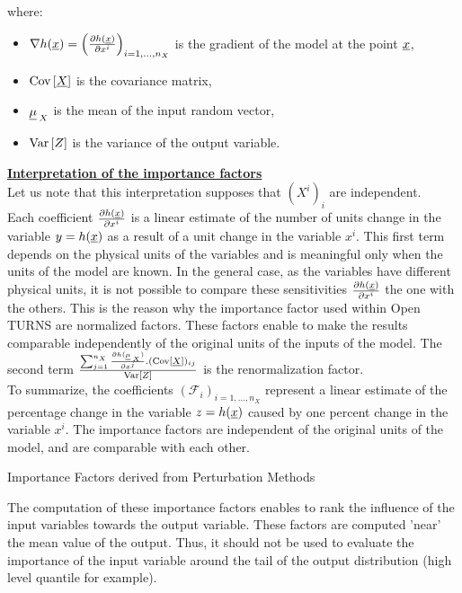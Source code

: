 {  where:
  \begin{itemize}
  \item $\nabla h(\underline{x}) = \left( \frac{\partial h(\underline{x})}{\partial x^i}\right)_{i=1,\ldots,n_X}$ is the gradient of the model at the point $\underline{x}$,
  \item ${\rm Cov}\left[ \underline{X} \right]$ is the covariance matrix,
  \item $\underline{\mu}_{\:X}$ is the mean of the input random vector,
  \item ${\rm Var}\left[ Z \right]$ is the variance of the output variable.
  \end{itemize}

  \textbf{\underline{Interpretation of the importance factors}}\\

  Let us note that this interpretation supposes that $(X^i)_i$ are independent.\\

  Each coefficient $\frac{\partial h(\underline{x})}{\partial x^i}$ is a linear estimate of the number of units change in the variable $y=h(\underline{x})$ as a result of a unit change in the variable $x^i$. This first term depends on the physical units of the variables and is  meaningful only when the units of the model are known. In the general case, as the variables have different physical units, it is not possible to compare these sensitivities $\frac{\partial h(\underline{x})}{\partial x^i}$ the one with the others. This is the reason why the importance factor used within Open TURNS are normalized factors. These factors enable to make the results comparable independently of the original units of the inputs of the model. The second term $\frac{\sum_{j=1}^{n_X} \frac{\partial h(\underline{\mu}_{\:X})}{\partial x^j}.({\rm Cov}\left[ \underline{X} \right])_{ij} }{{\rm Var}\left[ Z \right]}$ is the renormalization factor.\\

  To summarize, the coefficients $(\mathcal F_i)_{i=1,\ldots,n_X}$ represent a linear estimate of the percentage change in the variable $z = h(\underline{x})$ caused by one percent change in the variable $x^i$. The importance factors are independent of the original units of the model, and are comparable with each other.

}
{
  Importance Factors derived from Perturbation Methods
}

{
  The computation of these importance factors enables to rank the influence of the input variables towards the output variable. These factors are computed 'near' the mean value of the output. Thus, it should not be used to evaluate the importance of the input variable around the tail of the output distribution (high level quantile for example).
}

\Example{
--
}
